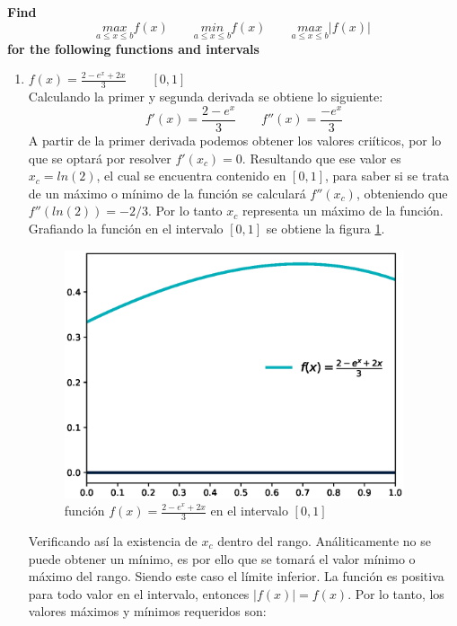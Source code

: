 \item \textbf{
    Find} \begin{equation*}
    \underset{a\leq x\leq b}{max} f(x) \qquad
    \underset{a\leq x\leq b}{min} f(x) \qquad
    \underset{a\leq x\leq b}{max} |f(x)|
\end{equation*}
\textbf{for the following functions and intervals}
\begin{enumerate}
    \item $f(x)= \frac{2-e^x+2x}{3} \qquad [0,1]$\\
          Calculando la primer y segunda derivada se obtiene lo siguiente:
          \begin{equation*}
              f'(x)= \frac{2-e^x}{3} \qquad f''(x)=\frac{-e^x}{3}
          \end{equation*}
          A partir de la primer derivada podemos obtener los valores criíticos, por lo que se optará por resolver $f'(x_c)=0$. Resultando que ese valor es $x_c=ln(2)$, el cual se encuentra contenido en $[0,1]$, para saber si se trata de un máximo o mínimo de la función se calculará $f''(x_c)$, obteniendo que $f''(ln(2))= -2/3$. Por lo tanto $x_c$ representa un máximo de la función. Grafiando la función en el intervalo $[0,1]$ se obtiene la figura \ref{fig:problema2a}.
          \begin{figure}[H]
              \centering
              \includegraphics[width=10cm]{Graphics/function_3.eps}
              \caption{función $f(x)= \frac{2-e^x+2x}{3}$ en el intervalo $[0,1]$}
              \label{fig:problema2a}
          \end{figure}
          Verificando así la existencia de $x_c$ dentro del rango. Análiticamente no se puede obtener un mínimo, es por ello que se tomará el valor mínimo o máximo del rango. Siendo este caso el límite inferior. La función es positiva para todo valor en el intervalo, entonces $|f(x)|=f(x)$. Por lo tanto, los valores máximos y mínimos requeridos son:

\end{enumerate}
